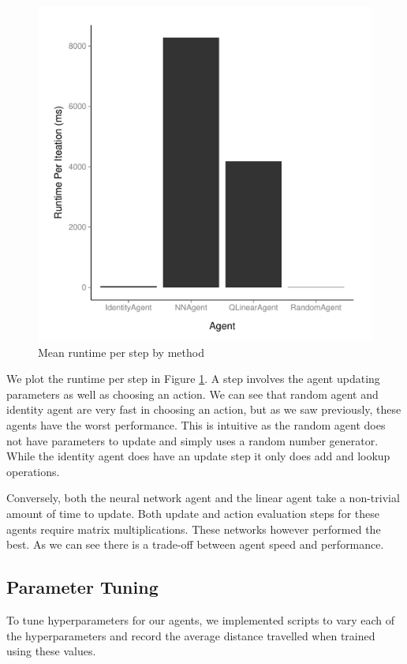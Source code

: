 \documentclass[12pt]{article}
\begin{document}
\begin{figure}
\includegraphics[scale=0.5]{imgs/runtime_bar.pdf}
\caption{Mean runtime per step by method}
\label{runtime_bar}
\end{figure}

We plot the runtime per step in Figure \ref{runtime_bar}. A step involves the agent updating parameters as well as choosing an action. We can see that random agent and identity agent are very fast in choosing an action, but as we saw previously, these agents have the worst performance. This is intuitive as the random agent does not have parameters to update and simply uses a random number generator. While the identity agent does have an update step it only does add and lookup operations.

Conversely, both the neural network agent and the linear agent take a non-trivial amount of time to update. Both update and action evaluation steps for these agents require matrix multiplications. These networks however performed the best. As we can see there is a trade-off between agent speed and performance.

\subsection{Parameter Tuning}

To tune hyperparameters for our agents, we implemented scripts to vary each of the hyperparameters and record the average distance travelled when trained using these values. 
\end{document}

